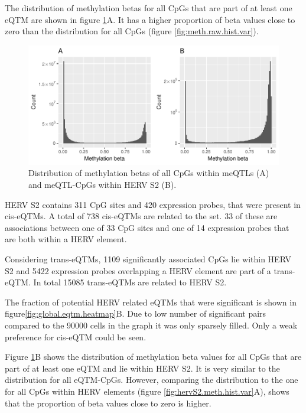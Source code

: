 \documentclass[a4paper,12pt,twoside,openright]{article}
\begin{document}
The distribution of methylation betas for all CpGs that are part of at least one eQTM are shown in figure \ref{fig:eqtm.meth.hist}A. It has a higher proportion of beta values close to zero than the distribution for all CpGs (figure \ref{fig:meth.raw.hist.var}). 

\begin{figure}[tb]
	\includegraphics[scale = 1, keepaspectratio = true]{../figures/eqtm_meth_hist}  
	\caption{Distribution of methylation betas of all CpGs within meQTLs (A) and meQTL-CpGs within HERV S2 (B).}
    \label{fig:eqtm.meth.hist}
\end{figure}

HERV S2 contains 311 CpG sites and 420 expression probes, that were present in cis-eQTMs. A total of 738 cis-eQTMs are related to the set. 33 of these are associations between one of 33 CpG sites and one of 14 expression probes that are both  within a HERV element. 

Considering trans-eQTMs, 1109 significantly associated CpGs lie within HERV S2 and 5422 expression probes overlapping a HERV element are part of a trans-eQTM. In total 15085 trans-eQTMs are related to HERV S2.

The fraction of potential HERV related eQTMs that were significant is shown in figure\ref{fig:global.eqtm.heatmap}B. Due to low number of significant pairs compared to the 90000 cells in the graph it was only sparsely filled. Only a weak preference for cis-eQTM could be seen. 

Figure \ref{fig:eqtm.meth.hist}B shows the distribution of methylation beta values for all CpGs that are part of at least one eQTM and lie within HERV S2. It is very similar to the distribution for all eQTM-CpGs. However, comparing the distribution to the one for all CpGs within HERV elements (figure \ref{fig:hervS2.meth.hist.var}A), shows that the proportion of beta values close to zero is higher.  
\end{document}
